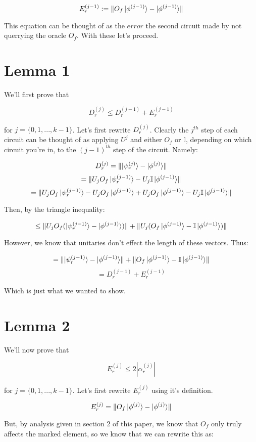 \documentclass[11pt]{article}
\newcommand{\abs}[1]{\left\lvert #1 \right\rvert}
\begin{document}
{
\[E^{(j-1)}_r := \lVert O_f\ket{\phi^{(j-1)}} - \ket{\phi^{(j-1)}} \rVert \]
}

This equation can be thought of as the $error$ the second circuit made by not querrying the oracle $O_f$. With these let's proceed.

\section{Lemma 1}

We'll first prove that 

{
\[D^{(j)}_r \leq D^{(j-1)}_r + E^{(j-1)}_r\]
}

for $ j = \{0,1,...,k-1\}$. Let's first rewrite $D^{(j)}_r$. Clearly the $j^{th}$ step of each circuit can be thought of as applying $U^j$ and either $O_f$ or $\mathbb{I}$, depending on which circuit you're in, to the $(j-1)^{th}$ step of the circuit. Namely: 

{
\[D^{(j)}_r = \lVert \ket{\psi_r^{(j)}} - \ket{\phi^{(j)}} \rVert\] 
\[= \lVert U_j O_f\ket{\psi_r^{(j-1)}} - U_j \mathbb{I} \ket{\phi^{(j-1)}} \rVert\]
\[= \lVert U_j O_f\ket{\psi_r^{(j-1)}} - U_j O_f \ket{\phi^{(j-1)}} + U_j O_f \ket{\phi^{(j-1)}} - U_j \mathbb{I} \ket{\phi^{(j-1)}} \rVert\]
}

Then, by the triangle inequality:

{
\[\leq \lVert U_j O_f(\ket{\psi_r^{(j-1)}} -\ket{\phi^{(j-1)}}) \rVert + \lVert U_j (O_f\ket{\phi^{(j-1)}} -\mathbb{I} \ket{\phi^{(j-1)}}) \rVert\]
}

However, we know that unitaries don't effect the length of these vectors. Thus:

{
\[= \lVert \ket{\psi_r^{(j-1)}} -\ket{\phi^{(j-1)}} \rVert + \lVert O_f\ket{\phi^{(j-1)}} -\mathbb{I} \ket{\phi^{(j-1)}} \rVert\]
\[= D^{(j-1)}_r + E^{(j-1)}_r\]
}

Which is just what we wanted to show.

\section{Lemma 2}

We'll now prove that 

{
\[E^{(j)}_r \leq 2 \abs{ \alpha_r^{(j)}} \]
}

for $ j = \{0,1,...,k-1\}$. Let's first rewrite $E^{(j)}_r$ using it's definition.

{
\[E^{(j)}_r = \lVert O_f\ket{\phi^{(j)}} - \ket{\phi^{(j)}} \rVert \]
}

But, by analysis given in section 2 of this paper, we know that $O_f$ only truly affects the marked element, so we know that we can rewrite this as:
\end{document}
